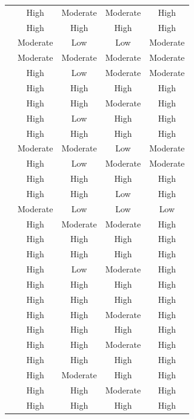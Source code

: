 \documentclass[a4paper,fleqn]{cas-sc}
\begin{document}
\begin{longtable}{|l|c|c|c|c|}
\citet{1Barbatsis201159} & High & Moderate & Moderate & High \\
\citet{2Mahamarowi2023133} & High & High & High & High \\
\citet{3Watson2011466} & Moderate & Low & Low & Moderate \\
\citet{4Cruz2017} & Moderate & Moderate & Moderate & Moderate \\
\citet{5kazanidis2018alpha} & High & Low & Moderate & Moderate \\
\citet{6Czerwinski2018} & High & High & High & High \\
\citet{8Yu2014} & High & High & Moderate & High \\
\citet{9Lin2018} & High & Low & High & High \\
\citet{10Huaman2019220} & High & High & High & High \\
\citet{11Ternblad2023115} & Moderate & Moderate & Low & Moderate \\
\citet{12Gilbert2019108} & High & Low & Moderate & Moderate \\
\citet{13Humpire2022} & High & High & High & High \\
\citet{14Forsyth2023} & High & High & Low & High \\
\citet{15Slater2022} & Moderate & Low & Low & Low \\
\citet{16Chen201447} & High & Moderate & Moderate & High \\
\citet{17Manzanares2019} & High & High & High & High \\
\citet{18Shih201054} & High & High & High & High \\
\citet{19Chou2019} & High & Low & Moderate & High \\
\citet{20Erandaru2014} & High & High & High & High \\
\citet{21Ghulamani2017} & High & High & High & High \\
\citet{22Nugroho2020149} & High & High & Moderate & High \\
\citet{23Zin2009322} & High & High & High & High \\
\citet{24Ghannem2019} & High & High & Moderate & High \\
\citet{25Repantis2011502} & High & High & High & High \\
\citet{28Chao201734} & High & Moderate & High & High \\
\citet{29Stiso20201165} & High & High & Moderate & High \\
\citet{30Zin2008} & High & High & High & High \\

\end{longtable}
\end{document}

